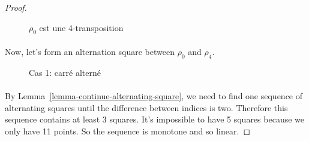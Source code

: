 \begin{proof}
\begin{figure}[H]
\begin{center}
\begin{tikzpicture}
      \end{tikzpicture}
      \caption{$\rho_0$ est une 4-transposition}
    \end{center}
  \end{figure}

  \paragraph{}
  Now, let's form an alternation square between $\rho_0$ and $\rho_4$.

  \begin{figure}[H]
    \begin{center}
      \caption{Cas 1: carré alterné}
    \end{center}
  \end{figure}

  \paragraph{}
  By Lemma~\ref{lemma-continue-alternating-square}, we need to find one sequence of alternating squares until the difference between indices is two. Therefore this sequence contains at least 3 squares. It's impossible to have 5 squares because we only have 11 points. So the sequence is monotone and so linear.


\end{proof}

